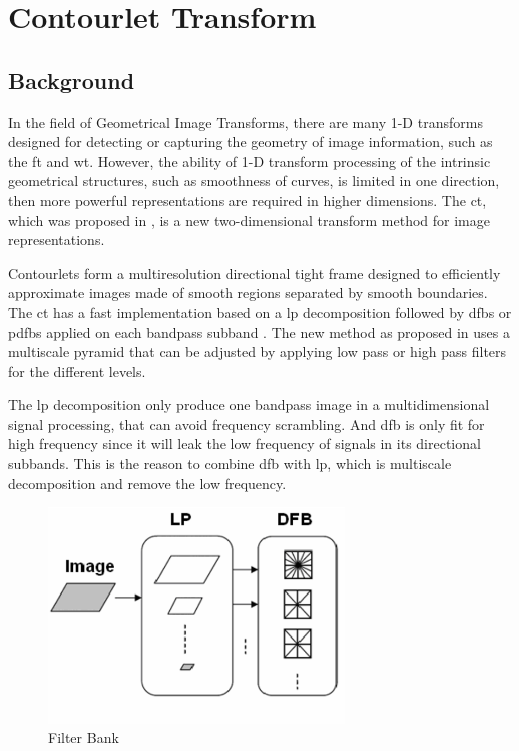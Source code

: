 \section{Contourlet Transform}
\label{sec:contourtransform}

\subsection{Background}
In the field of Geometrical Image Transforms, there are many 1-D transforms designed for detecting or capturing the geometry of image information, such as the \gls{ft} and \gls{wt}. However, the ability of 1-D transform processing of the intrinsic geometrical structures, such as smoothness of curves, is limited in one direction, then more powerful representations are required in higher dimensions. The \gls{ct}, which was proposed in \cite{do2005contourlet}, is a new two-dimensional transform method for image representations.

Contourlets form a multiresolution directional tight frame designed to efficiently approximate images made of smooth regions separated by smooth boundaries. The \gls{ct} has a fast implementation based on a \gls{lp} decomposition followed by \glspl{dfb} or \glspl{pdfb} applied on each bandpass subband \cite{suresh2014artificial}. The new method as proposed in \cite{lu2006new} uses a multiscale pyramid that can be adjusted by applying low pass or high pass filters for the different levels.

The \gls{lp} decomposition only produce one bandpass image in a multidimensional signal processing, that can avoid frequency scrambling. And \gls{dfb} is only fit for high frequency since it will leak the low frequency of signals in its directional subbands. This is the reason to combine \gls{dfb} with \gls{lp}, which is multiscale decomposition and remove the low frequency.

\begin{figure}[h]
	\centering
	\includegraphics[width=0.7\textwidth]{fig/contourlet}
	\caption[Contourlet Transform - Filter Bank]{Filter Bank}
	\label{fig:contourlet}
\end{figure}


